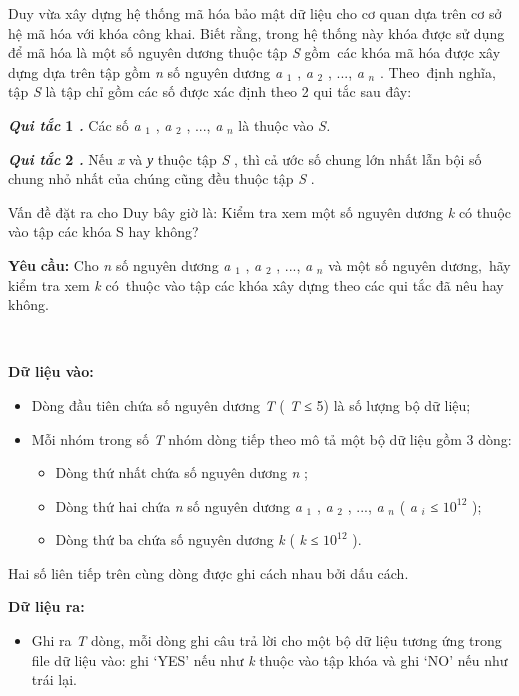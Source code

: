 

Duy vừa xây dựng hệ thống mã hóa bảo mật dữ liệu cho cơ quan dựa trên cơ sở hệ mã hóa với khóa công khai. Biết rằng, trong hệ thống này khóa được sử dụng để mã hóa là một số nguyên dương thuộc tập \emph{ S } gồm các khóa mã hóa được xây dựng dựa trên tập gồm \emph{ n } số nguyên dương \emph{ a }$_ 1 $ , \emph{ a }$_ 2 $ , ..., \emph{ a }\emph{$_ n $} . Theo định nghĩa, tập \emph{ S } là tập chỉ gồm các số được xác định theo 2 qui tắc sau đây:

\textbf{\emph{Qui tắc }}\textbf{ 1 \emph{ . }} Các số \emph{ a }$_ 1 $ , \emph{ a }$_ 2 $ , ..., \emph{ a }\emph{$_ n $} là thuộc vào \emph{ S. }

\textbf{\emph{Qui tắc }}\textbf{ 2 \emph{ . }} Nếu \emph{ x } và \emph{ у } thuộc tập \emph{ S } , thì cả ước số chung lớn nhất lẫn bội số chung nhỏ nhất của chúng cũng đều thuộc tập \emph{ S } .

Vấn đề đặt ra cho Duy bây giờ là: Kiểm tra xem một số nguyên dương \emph{ k } có thuộc vào tập các khóa S \emph{} hay không?

\textbf{Yêu }\textbf{}\textbf{ cầu: }\textbf{} Cho \emph{ n } số nguyên dương \emph{ a }$_ 1 $ , \emph{ a }$_ 2 $ , ..., \emph{ a }\emph{$_ n $} và một số nguyên dương, hãy kiểm tra xem \emph{ k } có thuộc vào tập các khóa xây dựng theo các qui tắc đã nêu hay không.

 

\textbf{Dữ liệu vào: }
\begin{itemize}
	\item Dòng đầu tiên chứa số nguyên dương \emph{ T } ( \emph{ T }\emph{} ≤ 5) là số lượng bộ dữ liệu;
	\item Mỗi nhóm trong số \emph{ T } nhóm dòng tiếp theo mô tả một bộ dữ liệu gồm 3 dòng:
\begin{itemize}
	\item Dòng thứ nhất chứa số nguyên dương \emph{ n } ;
	\item Dòng thứ hai chứa \emph{ n } số nguyên dương \emph{ a }$_ 1 $ , \emph{ a }$_ 2 $ , ..., \emph{ a }\emph{$_ n $}\emph{} ( \emph{ a }\emph{$_ i $}\emph{} ≤ $10^{12}$ );
	\item Dòng thứ ba chứa số nguyên dương \emph{ k } ( \emph{ k } ≤ $10^{12}$ ).
\end{itemize}
\end{itemize}

Hai số liên tiếp trên cùng dòng được ghi cách nhau bởi dấu cách.

\textbf{Dữ liệu ra:}
\begin{itemize}
	\item Ghi ra \emph{ T } dòng, mỗi dòng ghi câu trả lời cho một bộ dữ liệu tương ứng trong file dữ liệu vào: ghi ‘YES’ nếu như \emph{ k } thuộc vào tập khóa và ghi ‘NO’ nếu như trái lại.
\end{itemize}

